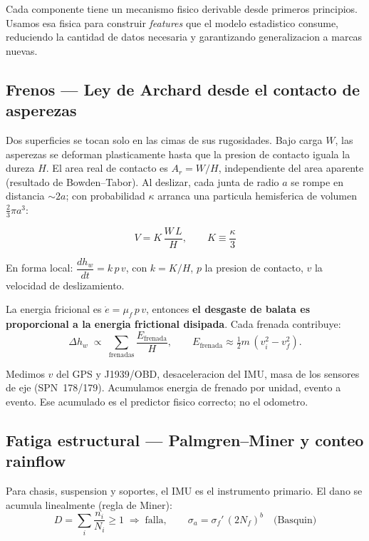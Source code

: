 \documentclass[10.5pt,a4paper]{article}
\begin{document}
Cada componente tiene un mecanismo fisico derivable desde primeros principios. Usamos esa fisica para construir \textit{features} que el modelo estadistico consume, reduciendo la cantidad de datos necesaria y garantizando generalizacion a marcas nuevas.

\subsection{Frenos --- Ley de Archard desde el contacto de asperezas}

Dos superficies se tocan solo en las cimas de sus rugosidades. Bajo carga $W$, las asperezas se deforman plasticamente hasta que la presion de contacto iguala la dureza $H$. El area real de contacto es $A_r = W/H$, independiente del area aparente (resultado de Bowden--Tabor). Al deslizar, cada junta de radio $a$ se rompe en distancia $\sim 2a$; con probabilidad $\kappa$ arranca una particula hemisferica de volumen $\frac{2}{3}\pi a^3$:

\begin{mathbox}
$$\boxed{V = K\,\frac{W\,L}{H}}, \qquad K \equiv \frac{\kappa}{3}$$

En forma local: $\dfrac{dh_w}{dt} = k\,p\,v$, \;\; con $k = K/H$, $p$ la presion de contacto, $v$ la velocidad de deslizamiento.
\end{mathbox}

La energia fricional es $\dot{e} = \mu_f\, p\, v$, entonces \textbf{el desgaste de balata es proporcional a la energia frictional disipada}. Cada frenada contribuye:
$$\Delta h_w \;\propto\; \sum_{\mathrm{frenadas}} \frac{E_{\mathrm{frenada}}}{H}, \qquad E_{\mathrm{frenada}} \approx \tfrac{1}{2}m\,(v_i^2 - v_f^2).$$

Medimos $v$ del GPS y J1939/OBD, desaceleracion del IMU, masa de los sensores de eje (SPN~178/179). Acumulamos energia de frenado por unidad, evento a evento. Ese acumulado es el predictor fisico correcto; no el odometro.

\subsection{Fatiga estructural --- Palmgren--Miner y conteo rainflow}

Para chasis, suspension y soportes, el IMU es el instrumento primario. El dano se acumula linealmente (regla de Miner):
$$D = \sum_i \frac{n_i}{N_i} \geq 1 \;\Rightarrow\; \text{falla}, \qquad \sigma_a = \sigma_f'\,(2N_f)^b \quad\text{(Basquin)}$$
\end{document}
